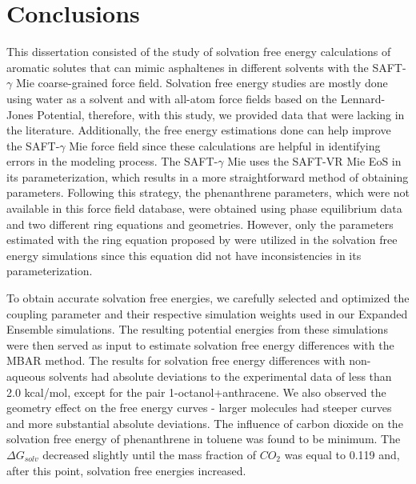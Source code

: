 \chapter{Conclusions} %

\label{Chapter6} 

This dissertation consisted of the study of solvation free energy calculations of aromatic solutes that can mimic asphaltenes in different solvents with the SAFT-$\gamma$ Mie coarse-grained force field. Solvation free energy studies are mostly done using water as a solvent and with all-atom force fields based on the Lennard-Jones Potential, therefore, with this study, we provided data that were lacking in the literature. Additionally, the free energy estimations done can help improve the SAFT-$\gamma$  Mie force field since these calculations are helpful in identifying errors in the modeling process. The SAFT-$\gamma$ Mie uses the SAFT-VR Mie EoS in its parameterization, which results in a more straightforward method of obtaining parameters. Following this strategy, the phenanthrene parameters, which were not available in this force field database, were obtained using phase equilibrium data and two different ring equations and geometries. However, only the parameters estimated with the ring equation proposed by  were utilized in the solvation free energy simulations since this equation did not have inconsistencies in its parameterization.

To obtain accurate solvation free energies, we carefully selected and optimized the coupling parameter and their respective simulation weights used in our Expanded Ensemble simulations. The resulting potential energies from these simulations were then served as input to estimate solvation free energy differences with the MBAR method. The results for solvation free energy differences with non-aqueous solvents had absolute deviations to the experimental
data of less than 2.0 kcal/mol, except for the pair 1-octanol+anthracene. We also observed the geometry effect on the free energy curves - larger molecules had steeper curves and more substantial absolute deviations. The influence of carbon dioxide on the solvation free energy of phenanthrene in toluene was found to be minimum. The $\Delta G_{solv}$ decreased slightly until the mass fraction of $CO_{2}$ was equal to 0.119 and, after this point, solvation free energies increased. 

